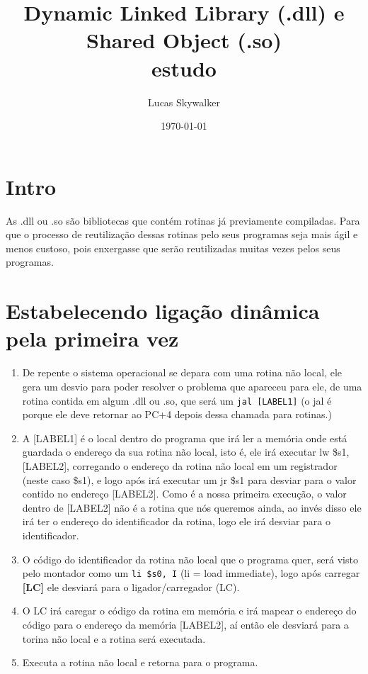 \documentclass{article}
\author {
  Lucas Skywalker
}
\title {
  Dynamic Linked Library (.dll) e Shared Object (.so)\\
  {
    \small estudo
  }
}
\date{\today}
\begin{document}
\maketitle

\section{Intro}
As .dll ou .so são bibliotecas que contém rotinas já previamente compiladas.
Para que o processo de reutilização dessas rotinas pelo seus programas seja mais
ágil e menos custoso, pois enxergasse que serão reutilizadas muitas vezes pelos
seus programas.

\section{Estabelecendo ligação dinâmica pela primeira vez}

  \begin{enumerate}
    \item De repente o sistema operacional se depara com uma rotina não local,
    ele gera um desvio para poder resolver o problema que apareceu para ele, de
    uma rotina contida em algum .dll ou .so, que será um \verb|jal [LABEL1]| (o
    jal é porque ele deve retornar ao PC+4 depois dessa chamada para rotinas.)

    \item A [LABEL1] é o local dentro do programa que irá ler a memória onde
    está guardada o endereço da sua rotina não local, isto é, ele irá executar
    lw \$s1, [LABEL2], corregando o endereço da rotina não local em um
    registrador (neste caso \$s1), e logo após irá executar um jr \$s1 para
    desviar para o valor contido no endereço [LABEL2]. Como é a nossa primeira
    execução, o valor dentro de [LABEL2] não é a rotina que nós queremos ainda,
    ao invés disso ele irá ter o endereço do identificador da rotina, logo ele
    irá desviar para o identificador.

    \item O código do identificador da rotina não local que o programa quer,
    será visto pelo montador como um \verb|li $s0, I| (li = load immediate),
    logo após carregar \textbf{[LC]} ele desviará para o ligador/carregador
    (LC).

    \item O LC irá caregar o código da rotina em memória e irá mapear o endereço
    do código para o endereço da memória [LABEL2], aí então ele desviará para a
    torina não local e a rotina será executada.

    \item Executa a rotina não local e retorna para o programa.
  \end{enumerate}
\end{document}
